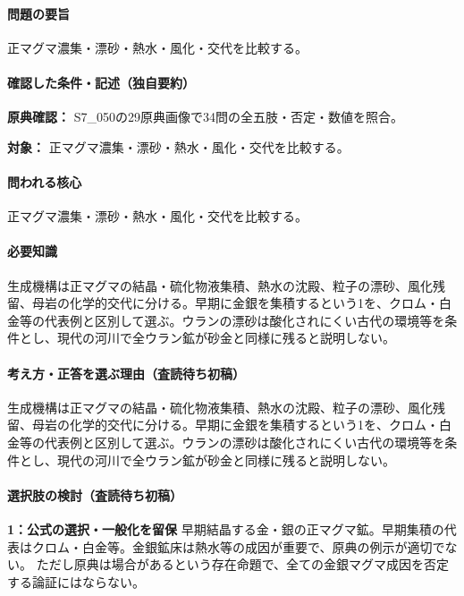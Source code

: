 \paragraph{問題の要旨} 正マグマ濃集・漂砂・熱水・風化・交代を比較する。

\paragraph{確認した条件・記述（独自要約）}\mbox{}\par

\noindent\textbf{原典確認：} S7\_050の29原典画像で34問の全五肢・否定・数値を照合。\par

\noindent\textbf{対象：} 正マグマ濃集・漂砂・熱水・風化・交代を比較する。\par

\paragraph{問われる核心} 正マグマ濃集・漂砂・熱水・風化・交代を比較する。

\paragraph{必要知識} 生成機構は正マグマの結晶・硫化物液集積、熱水の沈殿、粒子の漂砂、風化残留、母岩の化学的交代に分ける。早期に金銀を集積するという1を、クロム・白金等の代表例と区別して選ぶ。ウランの漂砂は酸化されにくい古代の環境等を条件とし、現代の河川で全ウラン鉱が砂金と同様に残ると説明しない。

\paragraph{考え方・正答を選ぶ理由（査読待ち初稿）} 生成機構は正マグマの結晶・硫化物液集積、熱水の沈殿、粒子の漂砂、風化残留、母岩の化学的交代に分ける。早期に金銀を集積するという1を、クロム・白金等の代表例と区別して選ぶ。ウランの漂砂は酸化されにくい古代の環境等を条件とし、現代の河川で全ウラン鉱が砂金と同様に残ると説明しない。

\paragraph{選択肢の検討（査読待ち初稿）}\mbox{}\par

\noindent\textbf{1：公式の選択・一般化を留保} 早期結晶する金・銀の正マグマ鉱。早期集積の代表はクロム・白金等。金銀鉱床は熱水等の成因が重要で、原典の例示が適切でない。 ただし原典は場合があるという存在命題で、全ての金銀マグマ成因を否定する論証にはならない。\par

